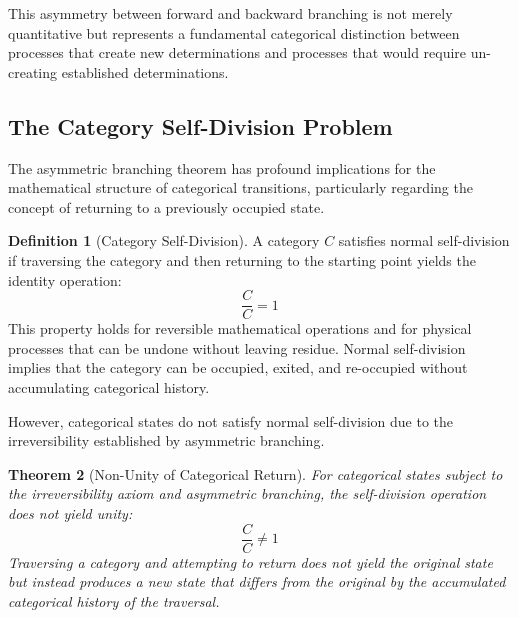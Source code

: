 \documentclass[12pt,a4paper]{article}
\newtheorem{theorem}{Theorem}[section]
\theoremstyle{definition}
\newtheorem{definition}[theorem]{Definition}
\theoremstyle{remark}
\begin{document}
This asymmetry between forward and backward branching is not merely quantitative but represents a fundamental categorical distinction between processes that create new determinations and processes that would require un-creating established determinations.

\subsection{The Category Self-Division Problem}

The asymmetric branching theorem has profound implications for the mathematical structure of categorical transitions, particularly regarding the concept of returning to a previously occupied state.

\begin{definition}[Category Self-Division]
A category $C$ satisfies normal self-division if traversing the category and then returning to the starting point yields the identity operation:
\begin{equation}
\frac{C}{C} = 1
\end{equation}
This property holds for reversible mathematical operations and for physical processes that can be undone without leaving residue. Normal self-division implies that the category can be occupied, exited, and re-occupied without accumulating categorical history.
\end{definition}

However, categorical states do not satisfy normal self-division due to the irreversibility established by asymmetric branching.

\begin{theorem}[Non-Unity of Categorical Return]
\label{thm:non_unity}
For categorical states subject to the irreversibility axiom and asymmetric branching, the self-division operation does not yield unity:
\begin{equation}
\frac{C}{C} \neq 1
\end{equation}
Traversing a category and attempting to return does not yield the original state but instead produces a new state that differs from the original by the accumulated categorical history of the traversal.
\end{theorem}
\end{document}
